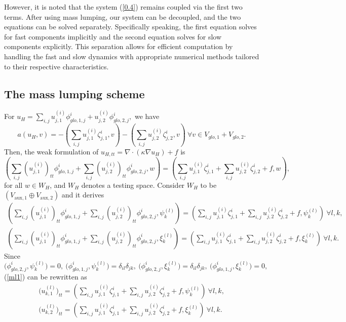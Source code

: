 \documentclass[preprint,12pt]{elsarticle}
\begin{document}
However, it is noted that the system (\ref{0.4}) remains coupled via the first two terms. After using mass lumping, our system can be decoupled, and the two equations can be solved separately. Specifically speaking, the first equation solves for fast components implicitly and the second equation solves for slow components explicitly. This separation allows for efficient computation by handling the fast and slow dynamics with appropriate numerical methods tailored to their respective characteristics.

\subsection{The mass lumping scheme}
For $u_H=\sum_{i,j}u_{j,1}^{(i)}\phi_{glo,1,j}^{i}+u_{j,2}^{(i)}\phi_{glo,2,j}^{i},$ we have
$$a(u_H,v)=-\left(\sum_{i,j}u_{j,1}^{(i)}\zeta_{j,1}^i,v\right)-\left(\sum_{i,j}u_{j,2}^{(i)}\zeta_{j,2}^i,v\right)~\forall v\in V_{glo,1}+V_{glo,2}.$$
Then, the weak formulation of $u_{H,tt}=\nabla\cdot(\kappa\nabla u_H)+f$ is
\begin{equation}
    \left(\sum_{i,j}(u_{j,1}^{(i)})_{tt}\phi_{glo,1,j}^{i}+\sum_{i,j}(u_{j,2}^{(i)})_{tt}\phi_{glo,2,j}^{i},w\right)=\left(\sum_{i,j}u_{j,1}^{(i)}\zeta_{j,1}^i+\sum_{i,j}u_{j,2}^{(i)}\zeta_{j,2}^i+f,w\right),
\end{equation}
for all $w\in W_H$, and $W_H$ denotes a testing space. Consider $W_H$ to be $(V_{\text{aux},1}\oplus V_{\text{aux},2})$ and it derives
\begin{equation}\label{ml1}
\begin{aligned}
    \left(\sum_{i,j}(u_{j,1}^{(i)})_{tt}\phi_{glo,1,j}^{i}+\sum_{i,j}(u_{j,2}^{(i)})_{tt}\phi_{glo,2,j}^{i},\psi_k^{(l)}\right)=\left(\sum_{i,j}u_{j,1}^{(i)}\zeta_{j,1}^i+\sum_{i,j}u_{j,2}^{(i)}\zeta_{j,2}^i+f,\psi_k^{(l)}\right)~\forall l,k,\\
    \left(\sum_{i,j}(u_{j,1}^{(i)})_{tt}\phi_{glo,1,j}^{i}+\sum_{i,j}(u_{j,2}^{(i)})_{tt}\phi_{glo,2,j}^{i},\xi_k^{(l)}\right)=\left(\sum_{i,j}u_{j,1}^{(i)}\zeta_{j,1}^i+\sum_{i,j}u_{j,2}^{(i)}\zeta_{j,2}^i+f,\xi_k^{(l)}\right)~\forall l,k.
\end{aligned}
\end{equation}
Since
$$\Big(\phi_{glo,2,j}^{i},\psi_k^{(l)}\Big)=0,~\Big(\phi_{glo,1,j}^{i},\psi_k^{(l)}\Big)=\delta_{il}\delta_{jk},~\Big(\phi_{glo,2,j}^{i},\xi_k^{(l)}\Big)=\delta_{il}\delta_{jk},~\Big(\phi_{glo,1,j}^{i},\xi_k^{(l)}\Big)=0,$$
(\ref{ml1}) can be rewritten as 
\begin{equation}\label{ml2}
\begin{aligned}
    \Big(u_{k,1}^{(l)}\Big)_{tt}=\left(\sum_{i,j}u_{j,1}^{(i)}\zeta_{j,1}^i+\sum_{i,j}u_{j,2}^{(i)}\zeta_{j,2}^i+f,\psi_k^{(l)}\right)~\forall l,k,\\
\Big(u_{k,2}^{(l)}\Big)_{tt}=\left(\sum_{i,j}u_{j,1}^{(i)}\zeta_{j,1}^i+\sum_{i,j}u_{j,2}^{(i)}\zeta_{j,2}^i+f,\xi_k^{(l)}\right)~\forall l,k.
\end{aligned}
\end{equation}
\end{document}
